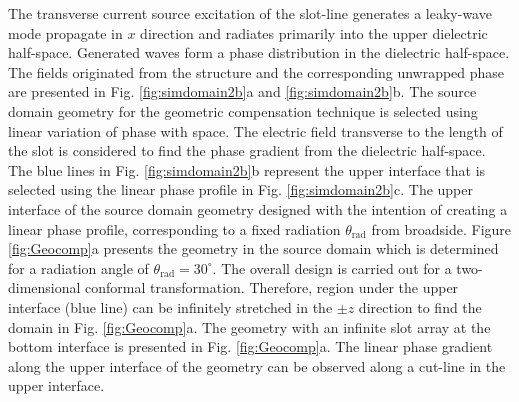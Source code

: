 The transverse current source excitation of the slot-line generates a leaky-wave mode propagate in $x$ direction and radiates primarily into the upper dielectric half-space. Generated waves form a phase distribution in the dielectric half-space. The fields originated from the structure and the corresponding unwrapped phase are presented in Fig. \ref{fig:simdomain2b}a and \ref{fig:simdomain2b}b. The source domain geometry for the geometric compensation technique is selected using linear variation of phase with space. The electric field transverse to the length of the slot is considered to find the phase gradient from the dielectric half-space. The blue lines in Fig. \ref{fig:simdomain2b}b represent the upper interface that is selected using the linear phase profile in Fig. \ref{fig:simdomain2b}c. The upper interface of the source domain geometry designed with the intention of creating a linear phase profile, corresponding to a fixed radiation $\theta_{\mathrm{rad}}$ from broadside. Figure \ref{fig:Geocomp}a presents the geometry in the source domain which is determined for a radiation angle of $\theta_{\mathrm{rad}} = 30^\circ$. The overall design is carried out for a two-dimensional conformal transformation. Therefore, region under the upper interface (blue line) can be infinitely stretched in the $\pm z$ direction to find the domain in Fig. \ref{fig:Geocomp}a. The geometry with an infinite slot array at the bottom interface is presented in Fig. \ref{fig:Geocomp}a. The linear phase gradient along the upper interface of the geometry can be observed along a cut-line in the upper interface. 

